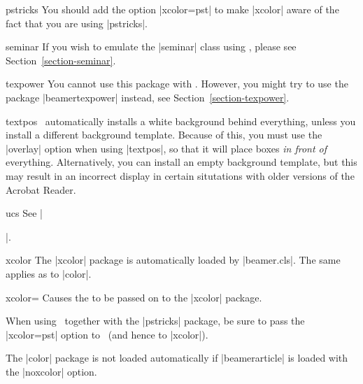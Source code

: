 \begin{package}{{pstricks}}
  You should add the option |xcolor=pst| to make |xcolor| aware of the fact that you are using |pstricks|.
\end{package}

\begin{class}{{seminar}}
  If you wish to emulate the |seminar| class using \beamer, please see Section~\ref{section-seminar}.
\end{class}

\begin{package}{{texpower}}
  You cannot use this package with \beamer. However, you might try to use the package |beamertexpower| instead, see Section~\ref{section-texpower}.
\end{package}

\begin{package}{{textpos}}
  \beamernote
  \beamer\ automatically installs a white background behind everything, unless you install a different background template. Because of this, you must use the |overlay| option when using |textpos|, so that it will place boxes \emph{in front of} everything. Alternatively, you can install an empty background template, but this may result in an incorrect display in certain situtations with older versions of the Acrobat Reader.
\end{package}

\begin{package}{{ucs}}
  See |\usepackage[utf8,utf8x]{inputenc}|.
\end{package}

\begin{package}{{xcolor}}
  \beamernote
  The |xcolor| package is automatically loaded by |beamer.cls|. The same applies as to |color|.

  \begin{classoption}{xcolor={\normalfont{}}}
    Causes the  to be passed on to the |xcolor| package.
  \end{classoption}

  When using \beamer\ together with the |pstricks| package, be sure to pass the |xcolor=pst| option to \beamer\ (and hence to |xcolor|).

  \articlenote
  The |color| package is not loaded automatically if |beamerarticle| is loaded with the |noxcolor| option.
\end{package}
